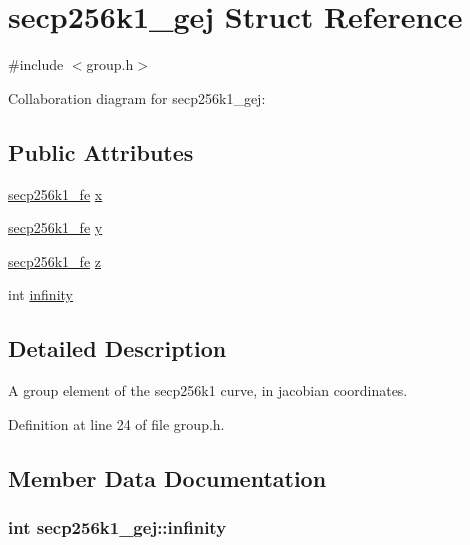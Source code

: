 \hypertarget{structsecp256k1__gej}{}\section{secp256k1\+\_\+gej Struct Reference}
\label{structsecp256k1__gej}


{\ttfamily \#include $<$group.\+h$>$}



Collaboration diagram for secp256k1\+\_\+gej\+:
\subsection*{Public Attributes}
\begin{DoxyCompactItemize}
\item 
\hyperlink{structsecp256k1__fe}{secp256k1\+\_\+fe} \hyperlink{structsecp256k1__gej_a7d2451c89411d62628ac466eb28c8ff5}{x}
\item 
\hyperlink{structsecp256k1__fe}{secp256k1\+\_\+fe} \hyperlink{structsecp256k1__gej_a29d5184060ad790d85a0c89a13820e0d}{y}
\item 
\hyperlink{structsecp256k1__fe}{secp256k1\+\_\+fe} \hyperlink{structsecp256k1__gej_ae41776408dba32cbe28b5e345b5f2286}{z}
\item 
int \hyperlink{structsecp256k1__gej_ab3ec8168caf27aa3a092d512eaadaad9}{infinity}
\end{DoxyCompactItemize}


\subsection{Detailed Description}
A group element of the secp256k1 curve, in jacobian coordinates. 

Definition at line 24 of file group.\+h.



\subsection{Member Data Documentation}
\hypertarget{structsecp256k1__gej_ab3ec8168caf27aa3a092d512eaadaad9}{}
\subsubsection[{infinity}]{\setlength{\rightskip}{0pt plus 5cm}int secp256k1\+\_\+gej\+::infinity}\label{structsecp256k1__gej_ab3ec8168caf27aa3a092d512eaadaad9}


